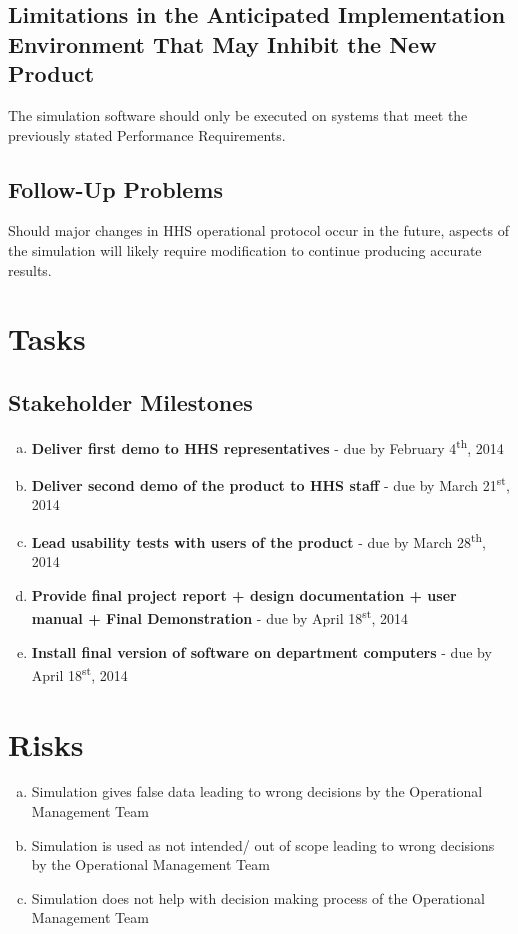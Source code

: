 \documentclass[paper=letter, fontsize=10pt]{scrartcl}
\numberwithin{equation}{section}		%
\numberwithin{figure}{section}			%
\numberwithin{table}{section}				%
\newcommand{\ts}{\textsuperscript}
\begin{document}
\subsection{Limitations in the Anticipated Implementation Environment That May Inhibit the New Product}
The simulation software should only be executed on systems that meet the previously stated Performance Requirements.
\subsection{Follow-Up Problems}
Should major changes in HHS operational protocol occur in the future, aspects of the simulation will likely require modification to continue producing accurate results.

\section{Tasks}
\subsection{Stakeholder Milestones}
\begin{enumerate}[(a)]	
	\item \textbf{Deliver first demo to HHS representatives} - due by February 4\ts{th}, 2014
	\item \textbf{Deliver second demo of the product to HHS staff} - due by March 21\ts{st}, 2014
	\item \textbf{Lead usability tests with users of the product} - due by March 28\ts{th}, 2014
	\item \textbf{Provide final project report + design documentation + user manual + Final Demonstration} - due by April 18\ts{st}, 2014
	\item \textbf{Install final version of software on department computers} - due by April 18\ts{st}, 2014
\end{enumerate}
\section{Risks}
\begin{enumerate}[(a)]
	\item Simulation gives false data leading to wrong decisions by the Operational Management Team
	\item Simulation is used as not intended/ out of scope leading to wrong decisions by the Operational Management Team
	\item Simulation does not help with decision making process of the Operational Management Team 
\end{enumerate}
\end{document}
